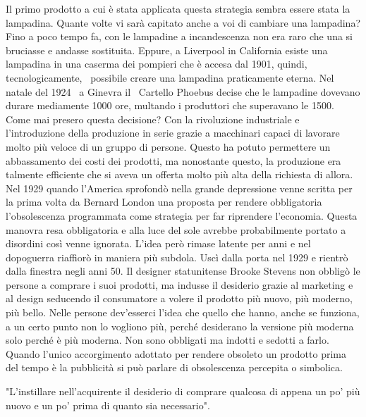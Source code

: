 \documentclass[12pt]{book} %
\begin{document}
Il primo prodotto a cui è stata applicata questa strategia sembra essere stata la lampadina. Quante volte vi sarà
capitato anche a voi di cambiare una lampadina? Fino a poco tempo fa, con le lampadine a incandescenza non era raro che
una si bruciasse e andasse sostituita. Eppure, a Liverpool in California esiste una lampadina in una caserma dei
pompieri che è accesa dal 1901, quindi, tecnologicamente, \ possibile creare una lampadina praticamente eterna. Nel
natale del 1924 \ a Ginevra il \ Cartello Phoebus decise che le lampadine dovevano durare mediamente 1000 ore, multando
i produttori che superavano le 1500. Come mai presero questa decisione? Con la rivoluzione industriale e
l'introduzione della produzione in serie grazie a macchinari capaci di lavorare molto più veloce
di un gruppo di persone. Questo ha potuto permettere un abbassamento dei costi dei prodotti, ma nonostante questo, la
produzione era talmente efficiente che si aveva un offerta molto più alta della richiesta di allora. Nel 1929 quando
l'America sprofondò nella grande depressione venne scritta per la prima volta da Bernard London
una proposta per rendere obbligatoria l'obsolescenza programmata come strategia per far riprendere
l'economia. Questa manovra resa obbligatoria e alla luce del sole avrebbe probabilmente portato a
disordini così venne ignorata. L'idea però rimase latente per anni e nel dopoguerra riaffiorò in
maniera più subdola. Uscì dalla porta nel 1929 e rientrò dalla finestra negli anni 50. Il designer statunitense Brooke
Stevens non obbligò le persone a comprare i suoi prodotti, ma indusse il desiderio grazie al marketing e al design
seducendo il consumatore a volere il prodotto più nuovo, più moderno, più bello. Nelle persone
dev'esserci l'idea che quello che hanno, anche se funziona, a un certo punto
non lo vogliono più, perché desiderano la versione più moderna solo perché è più moderna. Non sono obbligati ma indotti
e sedotti a farlo. Quando l'unico accorgimento adottato per rendere obsoleto un prodotto prima del tempo è la
pubblicità si può parlare di obsolescenza percepita o
simbolica. 

"L'instillare nell'acquirente il desiderio di comprare qualcosa di appena un po' più nuovo e un po'
prima di quanto sia necessario".
\end{document}
